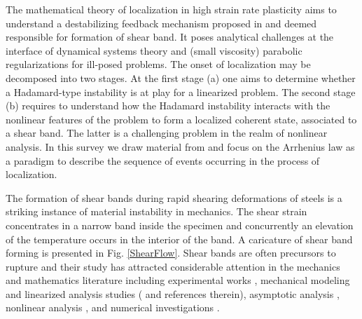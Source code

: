 \documentclass[a4paper,11pt]{article}
\theoremstyle{remark}
\begin{document}
The mathematical theory of localization in high strain rate plasticity aims to understand
a destabilizing feedback mechanism proposed in  \cite{ZH,CDHS} and
deemed responsible for formation of shear band.
It poses analytical challenges at the interface of dynamical systems theory 
and (small viscosity) parabolic regularizations for ill-posed problems.
The onset of localization may be decomposed into two stages.
At the first stage (a) one aims to determine whether a Hadamard-type instability is 
at play for a linearized problem. The second stage (b)  requires  to understand how the Hadamard instability
interacts with the nonlinear features of the problem to form a localized coherent state, 
associated to a shear band.
The latter is a challenging problem in the realm of nonlinear analysis.
In this survey we draw material from \cite{KT,KT2,BKT} and focus on the Arrhenius law as a
paradigm to describe the sequence of events occurring in the process of localization.



The formation of shear bands during rapid 
shearing deformations of steels \cite{CCHD,HDH,ZH}  is a striking instance of material instability in mechanics.
The shear strain concentrates in a narrow band inside the specimen and 
concurrently an elevation of the temperature occurs in the interior of the band.
A caricature of shear band forming is presented in Fig. \ref{ShearFlow}. 
Shear bands are often precursors to rupture and their study has attracted considerable
attention in the mechanics and mathematics literature including 
experimental works  \cite{CCHD,HDH}, mechanical modeling 
and  linearized analysis studies  (\cite{CDHS,FM,MC,WW,Wr} and references therein), 
asymptotic analysis \cite{DO, WrOc},
nonlinear analysis  \cite{DH,Tzavaras87,Tzavaras91,BPV},
and numerical  investigations \cite{Wa,ELW,BKT}.
\end{document}
